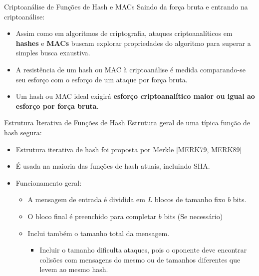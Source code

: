 \begin{frame}{Criptoanálise de Funções de Hash e MACs}
    Saindo da força bruta e entrando na criptoanálise:
    \begin{itemize}
        \item Assim como em algoritmos de criptografia, ataques criptoanalíticos em \textbf{hashes} e \textbf{MACs} buscam explorar propriedades do algoritmo para superar a simples busca exaustiva.
        \item A resistência de um hash ou MAC à criptoanálise é medida comparando-se seu esforço com o esforço de um ataque por força bruta.
        \item Um hash ou MAC ideal exigirá \textbf{esforço criptoanalítico maior ou igual ao esforço por força bruta}.
    \end{itemize}
\end{frame}
\begin{frame}{Estrutura Iterativa de Funções de Hash}
    Estrutura geral de uma típica  função de hash segura:
    \begin{itemize}
        \item Estrutura iterativa de hash foi proposta por Merkle [MERK79, MERK89]
        \item É usada na maioria das funções de hash atuais, incluindo SHA.
        \item Funcionamento geral:
              \begin{itemize}
                  \item A mensagem de entrada é dividida em $L$ blocos de tamanho fixo $b$ bits.
                  \item O bloco final é preenchido para completar $b$ bits (Se necessário)
                  \item Inclui também o tamanho total da mensagem.
                        \begin{itemize}
                            \item Incluir o tamanho dificulta ataques, pois o oponente deve encontrar colisões com mensagens do mesmo ou de tamanhos diferentes que levem ao mesmo hash.
                        \end{itemize}
              \end{itemize}
    \end{itemize}
\end{frame}

